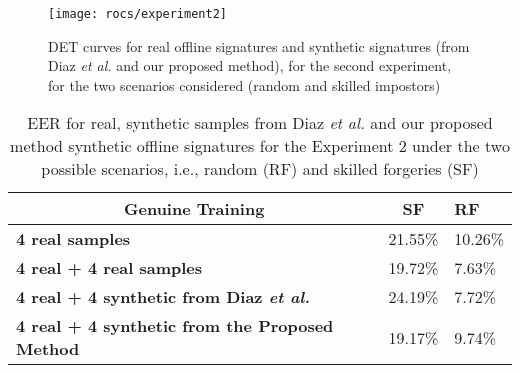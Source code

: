 \begin{figure}[!htb]
    \centering
    

    \texttt{[image: rocs/experiment2]}
    \caption{DET curves for real offline signatures and synthetic signatures (from Diaz \textit{et al.} and our proposed method), for the second experiment, for the two scenarios considered (random and skilled impostors)}
    \label{fig:exp2}
\end{figure}

\begin{table}[!htb]
    \renewcommand{\arraystretch}{1.3}
    \caption{EER for real, synthetic samples from Diaz \textit{et al.} \cite{diaz2014generation} and our proposed method synthetic offline signatures for the Experiment 2 under the two possible scenarios, i.e., random (RF) and skilled forgeries (SF)}
    \label{exp2_results_table}
    \centering
    \begin{tabular}{|l|l|l|}
        \hline
        \multicolumn{1}{|c|}{\textbf{Genuine Training}} & \multicolumn{1}{c|}{\textbf{SF}} & \textbf{RF} \\ \hline
        \textbf{4 real samples}                                         & 21.55\%                     & 10.26\%                         \\ \hline
        \textbf{4 real + 4 real samples}                       & 19.72\%                      & 7.63\%                        \\ \hline
        \textbf{4 real + 4 synthetic from Diaz \textit{et al.}}                           & 24.19\%                         & 7.72\%                \\ \hline
        \textbf{4 real + 4 synthetic from the Proposed Method}                           & 19.17\%         & 9.74\%                        \\ \hline
    \end{tabular}

\end{table}

